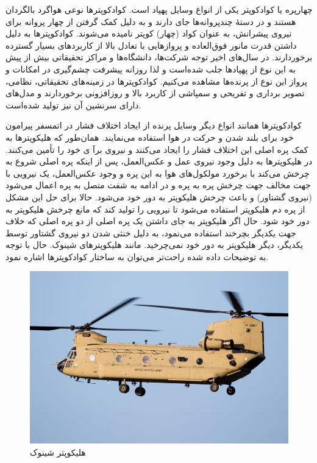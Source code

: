 


چهارپره یا کوادکوپتر یکی از انواع وسایل پهپاد است. کوادکوپترها نوعی هواگرد بالگردان هستند و در دستهٔ چندپروانه‌ها جای دارند و به دلیل کمک گرفتن از چهار پروانه برای نیروی پیشرانش، به عنوان کواد (چهار) کوپتر نامیده می‌شوند. کوادکوپترها به دلیل داشتن قدرت مانور فوق‌العاده و پروازهایی با تعادل بالا از کاربردهای بسیار گسترده برخوردارند.
در سال‌های اخیر توجه شرکت‌ها، دانشگاه‌ها و مراکز تحقیقاتی بیش از پیش به این نوع از پهپادها جلب شده‌است و لذا روزانه پیشرفت چشم‌گیری در امکانات و پرواز این نوع از پرنده‌ها مشاهده می‌کنیم. کوادکوپترها در زمینه‌های تحقیقاتی، نظامی، تصویر برداری و تفریحی و سمپاشی از کاربرد بالا و روزافزونی برخوردارند و مدل‌های دارای سرنشین آن نیز تولید شده‌است.




کوادکوپترها همانند انواع دیگر وسایل پرنده از ایجاد اختلاف فشار در اتمسفر پیرامون خود برای بلند شدن و حرکت در هوا استفاده می‌نمایند. همان‌طور که هلیکوپتر‌ها به کمک پره اصلی این اختلاف فشار را ایجاد می‌کنند و نیروی برآ ی خود را تأمین می‌کنند. در هلیکوپترها به دلیل وجود نیروی عمل و عکس‌العمل، پس از اینکه پره اصلی شروع به چرخش می‌کند با برخورد مولکول‌های هوا به این پره و وجود عکس‌العمل، یک نیرویی با جهت مخالف جهت چرخش پره به پره و در ادامه به شفت متصل به پره اعمال می‌شود (نیروی گشتاور) و باعث چرخش هلیکوپتر به دور خود می‌شود. حالا برای حل این مشکل از پره دم هلیکوپتر استفاده می‌شود تا نیرویی را تولید کند که مانع چرخش هلیکوپتر به دور خود شود. حال اگر هلیکوپتر به جای داشتن یک پره اصلی از دو پره اصلی که خلاف جهت یکدیگر بچرخند استفاده می‌نمود، به دلیل خنثی شدن دو نیروی گشتاور توسط یکدیگر، دیگر هلیکوپتر به دور خود نمی‌چرخید. مانند هلیکوپترهای شینوک. حال با توجه به توضیحات داده شده راحت‌تر می‌توان به ساختار کوادکوپترها اشاره نمود.
\begin{figure}[H]
	\includegraphics[width=12cm]{figs/introduction/boeing-ch-chinook.jpg}
	\centering
	\caption{هلیکوپتر شینوک\cite{CH-47}}
\end{figure}



